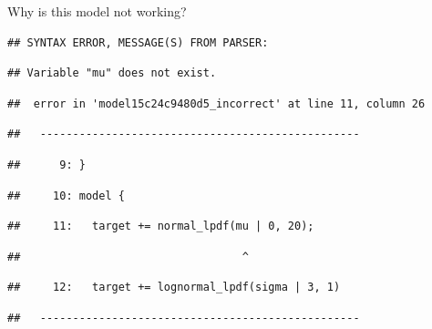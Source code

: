\documentclass[12pt,]{krantz}
\newenvironment{Shaded}{\begin{snugshade}}{\end{snugshade}}
\newcommand{\KeywordTok}[1]{\textcolor[rgb]{0.13,0.29,0.53}{\textbf{#1}}}
\newcommand{\DataTypeTok}[1]{\textcolor[rgb]{0.13,0.29,0.53}{#1}}
\newcommand{\StringTok}[1]{\textcolor[rgb]{0.31,0.60,0.02}{#1}}
\newcommand{\OperatorTok}[1]{\textcolor[rgb]{0.81,0.36,0.00}{\textbf{#1}}}
\newcommand{\NormalTok}[1]{#1}
\theoremstyle{definition}
\theoremstyle{definition}
\theoremstyle{definition}
\theoremstyle{remark}
\begin{document}
Why is this model not working?

\begin{Shaded}
\end{Shaded}

\begin{verbatim}
## SYNTAX ERROR, MESSAGE(S) FROM PARSER:
\end{verbatim}

\begin{verbatim}
## Variable "mu" does not exist.
\end{verbatim}

\begin{verbatim}
##  error in 'model15c24c9480d5_incorrect' at line 11, column 26
\end{verbatim}

\begin{verbatim}
##   -------------------------------------------------
\end{verbatim}

\begin{verbatim}
##      9: }
\end{verbatim}

\begin{verbatim}
##     10: model {
\end{verbatim}

\begin{verbatim}
##     11:   target += normal_lpdf(mu | 0, 20);
\end{verbatim}

\begin{verbatim}
##                                  ^
\end{verbatim}

\begin{verbatim}
##     12:   target += lognormal_lpdf(sigma | 3, 1)
\end{verbatim}

\begin{verbatim}
##   -------------------------------------------------
\end{verbatim}
\end{document}
